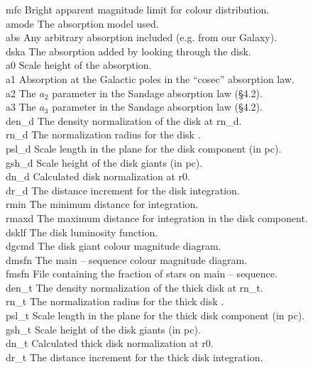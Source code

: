 \begin{tabbing}
mfc   \> Bright apparent magnitude limit for colour distribution. \\
amode \> The absorption model used. \\
abs   \> Any arbitrary absorption included (e.g. from our Galaxy). \\
dska  \> The absorption added by looking through the disk.\\
a0    \> Scale height of the absorption. \\
a1    \> Absorption at the Galactic poles in the ``cosec'' absorption law. \\
a2    \> The $a_2$ parameter in the Sandage absorption law (\S4.2). \\
a3    \> The $a_3$ parameter in the Sandage absorption law (\S4.2). \\
den\_d \> The density normalization of the disk at rn\_d. \\
rn\_d  \> The normalization radius for the disk \lf. \\
psl\_d \> Scale length in the plane for the disk component (in pc). \\
gsh\_d \> Scale height of the disk giants (in pc). \\
dn\_d  \> Calculated disk normalization at r0. \\
dr\_d  \> The distance increment for the disk integration. \\
rmin   \> The minimum distance for integration. \\
rmaxd  \> The maximum distance for integration in the disk component. \\
dsklf  \> The disk luminosity function. \\
dgcmd  \> The disk giant colour magnitude diagram. \\
dmsfn  \> The main -- sequence colour magnitude diagram. \\
fmsfn  \> File containing the fraction of stars on main -- sequence. \\
den\_t \> The density normalization of the thick disk at rn\_t. \\
rn\_t  \> The normalization radius for the thick disk \lf. \\
psl\_t \> Scale length in the plane for the thick disk component (in pc). \\
gsh\_t \> Scale height of the disk giants (in pc). \\
dn\_t  \> Calculated thick disk normalization at r0. \\
dr\_t  \> The distance increment for the thick disk integration. \\

\end{tabbing}
